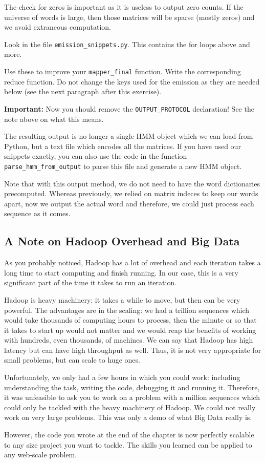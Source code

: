 The check for zeros is important as it is useless to output zero counts. If the
universe of words is large, then those matrices will be sparse (mostly zeros)
and we avoid extraneous computation.

\begin{exercise}
Look in the file \verb+emission_snippets.py+. This contains the for loops above
and more.

Use these to improve your \verb+mapper_final+ function. Write the corresponding
reduce function. Do not change the keys used for the emission as they are
needed below (see the next paragraph after this exercise).

\textbf{Important:} Now you should remove the \verb+OUTPUT_PROTOCOL+
declaration! See the note above on what this means.
\end{exercise}

The resulting output is no longer a single HMM object which we can load from
Python, but a text file which encodes all the matrices. If you have used our
snippets exactly, you can also use the code in the function
\verb+parse_hmm_from_output+ to parse this file and generate a new HMM object.

Note that with this output method, we do not need to have the word dictionaries
precomputed. Whereas previously, we relied on matrix indeces to keep our words
apart, now we output the actual word and therefore, we could just process each
sequence as it comes.

\subsection{A Note on Hadoop Overhead and Big Data}

As you probably noticed, Hadoop has a lot of overhead and each iteration takes
a long time to start computing and finish running. In our case, this is a very
significant part of the time it takes to run an iteration.

Hadoop is heavy machinery: it takes a while to move, but then can be very
powerful. The advantages are in the scaling: we had a trillion sequences which
would take thousands of computing hours to process, then the minute or so that
it takes to start up would not matter and we would reap the benefits of working
with hundreds, even thousands, of machines. We can say that Hadoop has high
latency but can have high throughput as well. Thus, it is not very appropriate
for small problems, but can scale to huge ones.

Unfortunately, we only had a few hours in which you could work: including
understanding the task, writing the code, debugging it and running it.
Therefore, it was unfeasible to ask you to work on a problem with a million
sequences which could only be tackled with the heavy machinery of Hadoop.
We could not really work on very large problems. This was only a demo of what
Big Data really is.

However, the code you wrote at the end of the chapter is now perfectly scalable
to any size project you want to tackle. The skills you learned can be applied
to any web-scale problem.

